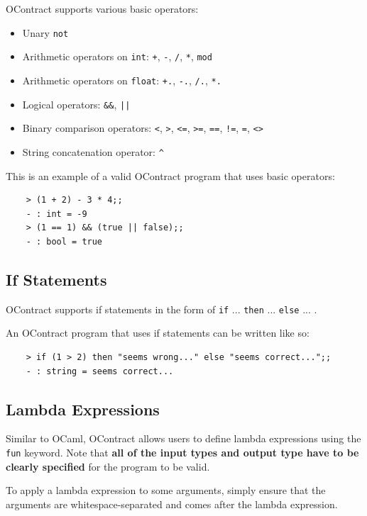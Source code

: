\documentclass[a4paper]{article}
\begin{document}
OContract supports various basic operators:

\begin{itemize}
    \item Unary \texttt{not}
    \item Arithmetic operators on \texttt{int}: \texttt{+}, \texttt{-}, \texttt{/}, \texttt{*}, \texttt{mod}
    \item Arithmetic operators on \texttt{float}: \texttt{+.}, \texttt{-.}, \texttt{/.}, \texttt{*.}
    \item Logical operators: \texttt{\&\&}, \texttt{||}
    \item Binary comparison operators: \texttt{<}, \texttt{>}, \texttt{<=}, \texttt{>=}, \texttt{==}, \texttt{!=}, \texttt{=}, \texttt{<>}
    \item String concatenation operator: \texttt{\^}
  \end{itemize}

This is an example of a valid OContract program that uses basic operators:

\begin{verbatim}
    > (1 + 2) - 3 * 4;;
    - : int = -9
    > (1 == 1) && (true || false);;
    - : bool = true
\end{verbatim}

\subsection{If Statements}

OContract supports if statements in the form of \texttt{if} ... \texttt{then} ... \texttt{else} ... .

An OContract program that uses if statements can be written like so:

\begin{verbatim}
    > if (1 > 2) then "seems wrong..." else "seems correct...";;
    - : string = seems correct...
\end{verbatim}

\subsection{Lambda Expressions}

Similar to OCaml, OContract allows users to define lambda expressions using the \texttt{fun} keyword.
Note that \textbf{all of the input types and output type have to be clearly specified} for the program to be valid.

To apply a lambda expression to some arguments, simply ensure that the arguments are whitespace-separated and comes after the lambda expression.
\end{document}
